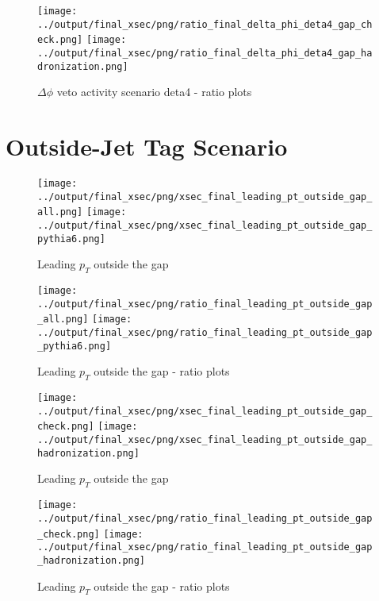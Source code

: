 \documentclass[11pt]{article}
\begin{document}
\begin{figure}[ht]
\centering
\texttt{[image: ../output/final\_xsec/png/ratio\_final\_delta\_phi\_deta4\_gap\_check.png]}
\texttt{[image: ../output/final\_xsec/png/ratio\_final\_delta\_phi\_deta4\_gap\_hadronization.png]}
\caption{$\Delta\phi$ veto activity scenario deta4 - ratio plots}
\label{fig:delta_phi_gap_deta4b_ratio}
\end{figure}

\clearpage
\section{Outside-Jet Tag Scenario}


\begin{figure}[ht]
\centering
\texttt{[image: ../output/final\_xsec/png/xsec\_final\_leading\_pt\_outside\_gap\_all.png]}
\texttt{[image: ../output/final\_xsec/png/xsec\_final\_leading\_pt\_outside\_gap\_pythia6.png]}
\caption{Leading $p_{T}$ outside the gap}
\label{fig:leading_pt_outside_gap}
\end{figure}

\begin{figure}[ht]
\centering
\texttt{[image: ../output/final\_xsec/png/ratio\_final\_leading\_pt\_outside\_gap\_all.png]}
\texttt{[image: ../output/final\_xsec/png/ratio\_final\_leading\_pt\_outside\_gap\_pythia6.png]}
\caption{Leading $p_{T}$ outside the gap - ratio plots}
\label{fig:leading_pt_outside_gap_ratio}
\end{figure}

\begin{figure}[ht]
\centering
\texttt{[image: ../output/final\_xsec/png/xsec\_final\_leading\_pt\_outside\_gap\_check.png]}
\texttt{[image: ../output/final\_xsec/png/xsec\_final\_leading\_pt\_outside\_gap\_hadronization.png]}
\caption{Leading $p_{T}$ outside the gap}
\label{fig:leading_pt_outside_gapb}
\end{figure}

\begin{figure}[ht]
\centering
\texttt{[image: ../output/final\_xsec/png/ratio\_final\_leading\_pt\_outside\_gap\_check.png]}
\texttt{[image: ../output/final\_xsec/png/ratio\_final\_leading\_pt\_outside\_gap\_hadronization.png]}
\caption{Leading $p_{T}$ outside the gap - ratio plots}
\label{fig:leading_pt_outside_gapb_ratio}
\end{figure}
\end{document}
